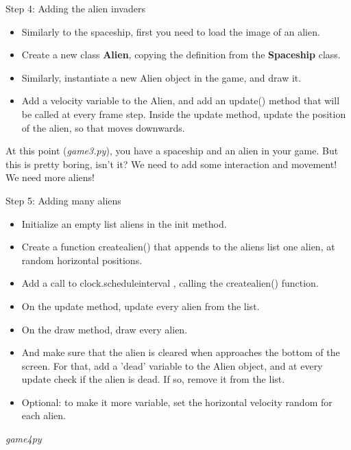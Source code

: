 \documentclass[10pt]{beamer}
\begin{document}
\begin{frame}{Step 4: Adding the alien invaders}

\begin{itemize}

\item Similarly to the spaceship, first you need to load the image of an alien.

\item Create a new class \textbf{Alien}, copying the definition from the \textbf{Spaceship} class. 

\item Similarly, instantiate a new Alien object in the game, and draw it. 

\item Add a velocity variable to the Alien, and add an update() method that will be called at every frame step. Inside the update method, update the position of the alien, so that moves downwards.

\end{itemize}

At this point (\textit{game3.py}), you have a spaceship and an alien in your game. But this is pretty boring, isn't it?
We need to add some interaction and movement! We need more aliens!

\end{frame}

\begin{frame}{Step 5: Adding many aliens}

\begin{itemize}
\item Initialize an empty list aliens in the init method. 

\item Create a function createalien() that appends to the aliens list one alien, at random horizontal positions.

\item Add a call to clock.scheduleinterval , calling the createalien() function. 

\item On the update method, update every alien from the list.

\item On the draw method, draw every alien.

\item And make sure that the alien is cleared when approaches the bottom of the screen. For that, add a 'dead' variable to the Alien object, and at every update check if the alien is dead.
If so, remove it from the list.

\item Optional: to make it more variable, set the horizontal velocity random for each alien.
\end{itemize}

\textit{game4py}

\end{frame}
\end{document}
